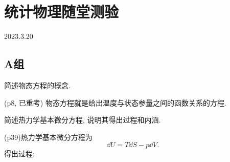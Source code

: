 \section{统计物理随堂测验}
2023.3.20
\subsection{A组}
\begin{questions}
  \question 简述物态方程的概念.
  \begin{solution}
    (p8, 已重考) 物态方程就是给出温度与状态参量之间的函数关系的方程.
  \end{solution}
  \question 简述热力学基本微分方程, 说明其得出过程和内涵.
  \begin{solution}
    (p39)热力学基本微分方程为
    \begin{equation}
      \dd U = T\dd S - p\dd V.
    \end{equation}
    得出过程:


\end{solution}
\end{questions}
